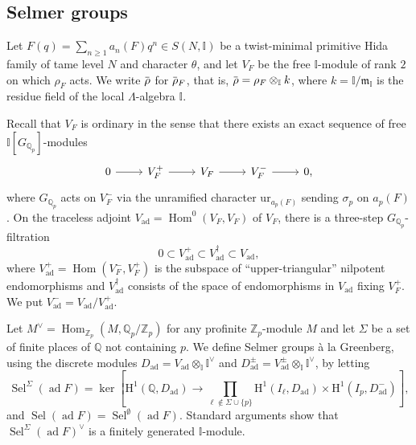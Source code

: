 \documentclass[12pt]{amsart}
\newcommand\bI{\mathbb{I}}
\newcommand\bQ{\mathbb{Q}}
\newcommand\Zp{{\mathbb{Z}_p}}
\newcommand\Qp{{\mathbb{Q}_p}}
\newcommand\gm{\mathfrak{m}}
\newcommand{\ob}[1]{\mkern 1.5mu\overline{\mkern-1.5mu#1\mkern-1.5mu}\mkern 1.5mu}
\DeclareMathOperator{\Hom}{Hom}
\DeclareMathOperator{\ad}{ad}
\DeclareMathOperator{\Sel}{Sel}
\newcommand{\HH}{\mathrm{H}}
\newcommand{\ur}{\mathrm{ur}}
\theoremstyle{defstyle}
\theoremstyle{thmstyle}
\begin{document}
\subsection{Selmer groups}
Let $F(q)=\sum_{n\geq 1}a_n(F)q^n\in S(N,\bI)$ be a twist-minimal primitive Hida family of tame level $N$ and character $\theta$, and let $V_F$ be the free $\bI$-module of rank $2$ on which $\rho_F$ acts. We write $\ob{\rho}$ for $\ob{\rho}_F$, that is, $\ob{\rho}=\rho_F \otimes_\bI k$, where $k=\bI/\gm_\bI$ is the residue field of the local $\Lambda$-algebra $\bI$.

Recall that $V_F$ is ordinary in the sense that there exists an exact sequence of free $\bI[G_{\Qp}]$-modules
\[\begin{tikzcd}
	0 \rar & V_F^+ \rar & V_F \rar & V_F^- \rar & 0,
\end{tikzcd}\]
where $G_{\Qp}$ acts on $V_F^-$ via the unramified character $\ur_{a_p(F)}$ sending $\sigma_p$ on $a_p(F)$. 
On the traceless adjoint $V_{\ad}=\Hom^0(V_F,V_F)$ of $V_F$, there is a three-step $G_{\Qp}$-filtration
\begin{equation}\label{eq:filtration}
	0 \subset V_{\ad}^+ \subset V_{\ad}^\dagger \subset V_{\ad},
\end{equation}
where $V_{\ad}^+=\Hom(V_F^-,V_F^+)$ is the subspace of ``upper-triangular'' nilpotent endomorphisms and $V_{\ad}^\dagger$ consists of the space of endomorphisms in $V_{\ad}$ fixing $V_F^+$. We put $V_{\ad}^-=V_{\ad}/V_{\ad}^+$. 

Let $M^\vee=\Hom_{\Zp}(M,\Qp/\Zp)$ for any profinite $\Zp$-module $M$ and let $\Sigma$ be a set of finite places of $\bQ$ not containing $p$. We define Selmer groups à la Greenberg, using the discrete modules $D_{\ad}=V_{\ad} \otimes_{\bI} \bI^\vee$ and $D^\pm_{\ad}=V^\pm_{\ad} \otimes_{\bI} \bI^\vee$, by letting
\small
\begin{equation}\label{eq:def_sel_sigma}
	\Sel^\Sigma(\ad F)= \ker\left[\HH^1(\bQ,D_{\ad}) \to \prod_{\ell \notin \Sigma\cup\{p\}} \HH^1(I_\ell,D_{\ad}) \times \HH^1(I_p,D^-_{\ad})\right],
\end{equation}\normalsize
and $\Sel(\ad F)=\Sel^\emptyset(\ad F)$. Standard arguments show that $\Sel^\Sigma(\ad F)^\vee$ is a finitely generated $\bI$-module. 
\end{document}
